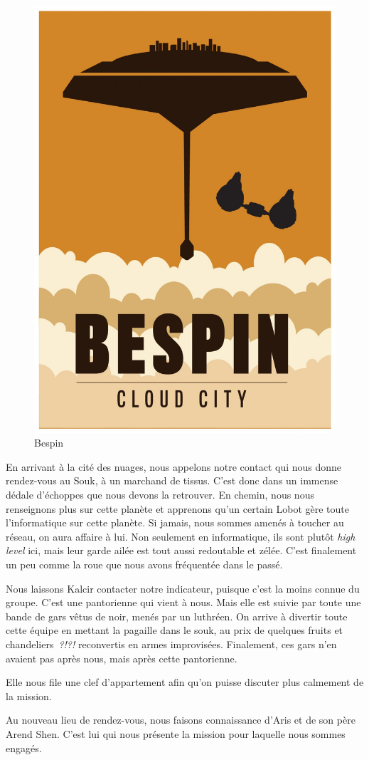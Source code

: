 \documentclass[a4paper,9pt,twoside,twocolumn,openany]{book}
\begin{document}
\begin{figure}
    \includegraphics[width=0.5\columnwidth]{img/bespin_poster}
    \caption{Bespin}
\end{figure}


En arrivant à la cité des nuages, nous appelons notre contact qui nous donne rendez-vous au Souk, à un marchand de tissus. C'est donc dans un immense dédale d'échoppes que nous devons la retrouver. En chemin, nous nous renseignons plus sur cette planète et apprenons qu'un certain Lobot gère toute l'informatique sur cette planète. Si jamais, nous sommes amenés à toucher au réseau, on aura affaire à lui. Non seulement en informatique, ils sont plutôt \emph{high level} ici, mais leur garde ailée est tout aussi redoutable et zélée. C'est finalement un peu comme la roue que nous avons fréquentée dans le passé. 

Nous laissons Kalcir contacter notre indicateur, puisque c'est la moins connue du groupe. C'est une pantorienne qui vient à nous. Mais elle est suivie par toute une bande de gars vêtus de noir, menés par un luthréen. On arrive à divertir toute cette équipe en mettant la pagaille dans le souk, au prix de quelques fruits et chandeliers\ \emph{?!?!} reconvertis en armes improvisées. Finalement, ces gars n'en avaient pas après nous, mais après cette pantorienne.

Elle nous file une clef d'appartement afin qu'on puisse discuter plus calmement de la mission.

Au nouveau lieu de rendez-vous, nous faisons connaissance d’Aris et de son père Arend Shen. C'est lui qui nous présente la mission pour laquelle nous sommes engagés.
\end{document}
